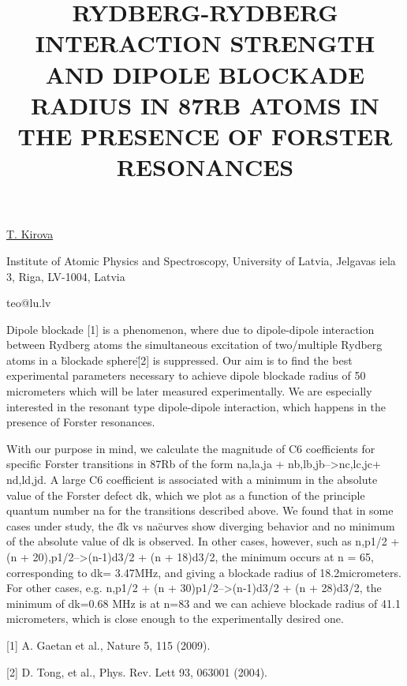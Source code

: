 \title{RYDBERG-RYDBERG INTERACTION STRENGTH AND DIPOLE BLOCKADE RADIUS IN 87RB ATOMS IN THE PRESENCE OF FORSTER RESONANCES}

\underline{T. Kirova}  

{\normalsize{\vspace{-4mm}
Institute of Atomic Physics and Spectroscopy,
University of Latvia,
Jelgavas iela 3,
Riga, LV-1004,
Latvia



\email teo@lu.lv}}

Dipole blockade [1] is a phenomenon, where due to dipole-dipole interaction between Rydberg atoms the simultaneous excitation of two/multiple Rydberg atoms in a \"blockade sphere\" [2] is suppressed. Our aim is to find the best experimental parameters necessary to achieve dipole blockade radius of  50 micrometers which will be later measured experimentally. We are especially interested in the resonant type dipole-dipole interaction, which happens in the presence of Forster resonances.
 
With our purpose in mind, we calculate the magnitude of C6  coefficients for specific Forster transitions in 87Rb of the form  na,la,ja + nb,lb,jb-->nc,lc,jc+ nd,ld,jd. A large C6 coefficient is associated with a minimum in the absolute value of the Forster defect dk, which we plot as a function of the principle quantum number na for the transitions described above. We found that in some cases under study, the \"dk vs na\" curves show diverging behavior and no minimum of the absolute value of dk is observed. In other cases, however, such as n,p1/2 + (n + 20),p1/2-->(n-1)d3/2 + (n + 18)d3/2, the minimum occurs at n = 65, corresponding to dk= 3.47MHz, and giving a blockade radius of 18.2micrometers. For other cases, e.g. n,p1/2 + (n + 30)p1/2-->(n-1)d3/2 + (n + 28)d3/2, the minimum of dk=0.68 MHz is at n=83 and we can achieve blockade radius of 41.1 micrometers, which is close enough to the experimentally desired one.

{\normalsize
[1] A. Gaetan et al., Nature 5, 115 (2009).
\vsp

[2] D. Tong, et al., Phys. Rev. Lett 93, 063001 (2004).
}


\vspace{\baselineskip}